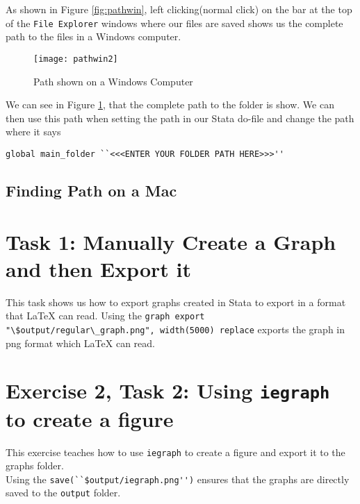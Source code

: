 \documentclass[]{article}
\begin{document}
As shown in Figure \ref{fig:pathwin}, left clicking(normal click) on the bar at the top of the \texttt{File Explorer} windows where our files are saved shows us the complete path to the files in a Windows computer. \\

\begin{figure}[H]
	\centering
	\texttt{[image: pathwin2]}
	\caption{Path shown on a Windows Computer}
	\label{fig:pathwin2}
\end{figure}

We can see in Figure \ref{fig:pathwin2}, that the complete path to the folder is show. We can then use this path when setting the path in our Stata do-file and change the path where it says \begin{verbatim}
global main_folder ``<<<ENTER YOUR FOLDER PATH HERE>>>''
\end{verbatim} 

\subsection*{Finding Path on a Mac}

\section*{Task 1: Manually Create a Graph and then Export it}

This task shows us how to export graphs created in Stata to export in a format that {\LaTeX} can read. Using the \verb|graph export "\$output/regular\_graph.png", width(5000) replace| 
exports the graph in png format which {\LaTeX} can read. 
\section*{Exercise 2, Task 2: Using \texttt{iegraph} to create a figure}

This exercise teaches how to use \texttt{iegraph} to create a figure and export it to the graphs folder. \\

Using the \verb|save(``$output/iegraph.png'')| ensures that the graphs are directly saved to the \texttt{output} folder. 

\section*{}
	
\end{document}
